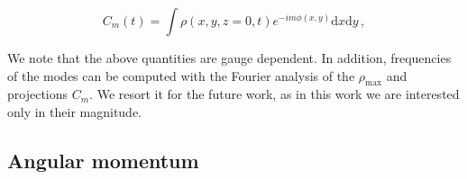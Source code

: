 \begin{equation}
\label{eq:modes}
C_m(t) = \int \rho(x,y,z=0,t) e^{-i m \phi(x,y)} \text{d}x \text{d} y \, ,
\end{equation}

%
We note that the above quantities are gauge dependent.
%
%
In addition, frequencies of the modes can be computed with the Fourier analysis 
of the $\rho_{\text{max}}$ and projections $C_{m}$. We resort it for the future work, 
as in this work we are interested only in their magnitude. 





\subsection{Angular momentum} \label{sec:bns_sims:method:ang_mom}



%

